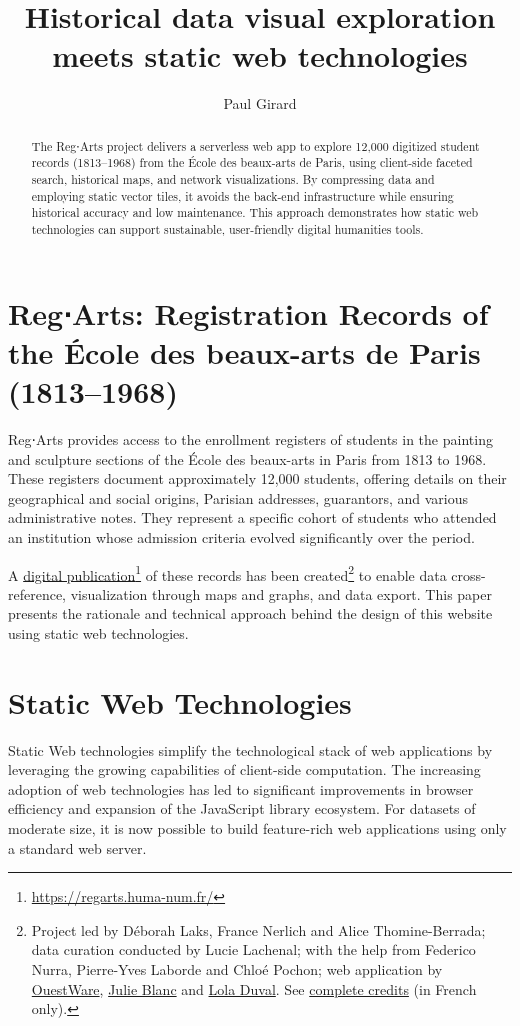 \documentclass[final]{anthology-ch} %
\title{Historical data visual exploration meets static web technologies}
\author[1]{Paul Girard}[
  orcid=0000-0001-9332-3308
]
\affiliation{1}{OuestWare, Nantes, France}
\begin{document}
\maketitle
\begin{abstract}
The Reg⋅Arts project delivers a serverless web app to explore 12,000 digitized student records (1813–1968) from the École des beaux-arts de Paris, using client-side faceted search, historical maps, and network visualizations. By compressing data and employing static vector tiles, it avoids the back-end infrastructure while ensuring historical accuracy and low maintenance. This approach demonstrates how static web technologies can support sustainable, user-friendly digital humanities tools.
\end{abstract}

\section{Reg⋅Arts: Registration Records of the École des beaux-arts de Paris (1813--1968)}
Reg⋅Arts provides access to the enrollment registers of students in the painting and sculpture sections of the École des beaux-arts in Paris from 1813 to 1968. These registers document approximately 12,000 students, offering details on their geographical and social origins, Parisian addresses, guarantors, and various administrative notes. They represent a specific cohort of students who attended an institution whose admission criteria evolved significantly over the period.

A \href{https://regarts.huma-num.fr/}{digital publication}\footnote{\href{https://regarts.huma-num.fr/}{https://regarts.huma-num.fr/}} of these records has been created\footnote{Project led by Déborah Laks, France Nerlich and Alice Thomine-Berrada; data curation conducted by Lucie Lachenal; with the help from Federico Nurra, Pierre-Yves Laborde and Chloé Pochon; web application by \href{https://ouestware.com}{OuestWare}, \href{https://julie-blanc.fr/}{Julie Blanc} and \href{https://loladuval.com/}{Lola Duval}. See \href{https://regarts.huma-num.fr/a-propos\#lequipe}{complete credits} (in French only).} to enable data cross-reference, visualization through maps and graphs, and data export. This paper presents the rationale and technical approach behind the design of this website using static web technologies.

\section{Static Web Technologies}
Static Web technologies simplify the technological stack of web applications by leveraging the growing capabilities of client-side computation. The increasing adoption of web technologies has led to significant improvements in browser efficiency and expansion of the JavaScript library ecosystem. For datasets of moderate size, it is now possible to build feature-rich web applications using only a standard web server.
\end{document}
